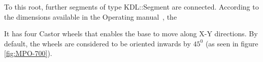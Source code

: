  To this root, further segments of type KDL::Segment are connected. According to the dimensions available in the Operating manual~\cite{MPO700}, the 




It has four Castor wheels that enables the base to move along X-Y directions. By default, the wheels are considered to be oriented inwards by $45^0$ (as seen in figure \ref{fig:MPO-700}). 


